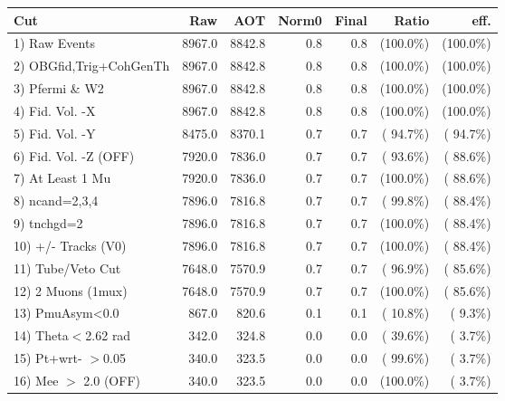  \begin{table}[h!]\centering
 \begin{tabular}{||l||r|r|r|r|r|r||}
 \hline
 \hline
 Cut & Raw & AOT & Norm0 & Final & Ratio & eff.       \\
 \hline
  1) Raw Events           &       8967.0 &       8842.8 &          0.8 &          0.8 & (100.0\%) & (100.0\%) \\
  2) OBGfid,Trig+CohGenTh &       8967.0 &       8842.8 &          0.8 &          0.8 & (100.0\%) & (100.0\%) \\
  3) Pfermi \& W2         &       8967.0 &       8842.8 &          0.8 &          0.8 & (100.0\%) & (100.0\%) \\
  4) Fid. Vol. -X         &       8967.0 &       8842.8 &          0.8 &          0.8 & (100.0\%) & (100.0\%) \\
  5) Fid. Vol. -Y         &       8475.0 &       8370.1 &          0.7 &          0.7 & ( 94.7\%) & ( 94.7\%) \\
  6) Fid. Vol. -Z (OFF)   &       7920.0 &       7836.0 &          0.7 &          0.7 & ( 93.6\%) & ( 88.6\%) \\
  7) At Least 1 Mu        &       7920.0 &       7836.0 &          0.7 &          0.7 & (100.0\%) & ( 88.6\%) \\
  8) ncand=2,3,4          &       7896.0 &       7816.8 &          0.7 &          0.7 & ( 99.8\%) & ( 88.4\%) \\
  9) tnchgd=2             &       7896.0 &       7816.8 &          0.7 &          0.7 & (100.0\%) & ( 88.4\%) \\
 10) +/- Tracks (V0)      &       7896.0 &       7816.8 &          0.7 &          0.7 & (100.0\%) & ( 88.4\%) \\
 11) Tube/Veto Cut        &       7648.0 &       7570.9 &          0.7 &          0.7 & ( 96.9\%) & ( 85.6\%) \\
 12) 2 Muons (1mux)       &       7648.0 &       7570.9 &          0.7 &          0.7 & (100.0\%) & ( 85.6\%) \\
 13) PmuAsym<0.0          &        867.0 &        820.6 &          0.1 &          0.1 & ( 10.8\%) & (  9.3\%) \\
 14) Theta$<$2.62 rad     &        342.0 &        324.8 &          0.0 &          0.0 & ( 39.6\%) & (  3.7\%) \\
 15) Pt+wrt- $>$0.05      &        340.0 &        323.5 &          0.0 &          0.0 & ( 99.6\%) & (  3.7\%) \\
 16) Mee $>$ 2.0  (OFF)   &        340.0 &        323.5 &          0.0 &          0.0 & (100.0\%) & (  3.7\%) \\

\end{tabular}
\end{table}
